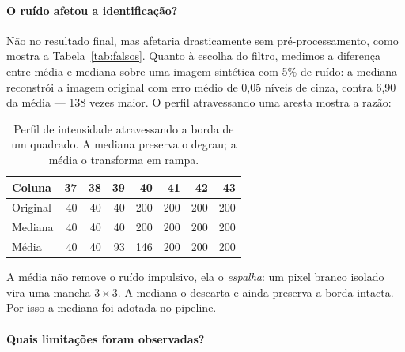 \documentclass[12pt,a4paper]{article}
\begin{document}
\paragraph{O ruído afetou a identificação?} Não no resultado final, mas
afetaria drasticamente sem pré-processamento, como mostra a
Tabela~\ref{tab:falsos}. Quanto à escolha do filtro, medimos a diferença entre
média e mediana sobre uma imagem sintética com 5\% de ruído: a mediana
reconstrói a imagem original com erro médio de 0,05 níveis de cinza, contra
6,90 da média --- 138 vezes maior. O perfil atravessando uma aresta mostra a
razão:

\begin{table}[H]
\centering
\begin{tabular}{lrrrrrrr}
\toprule
\textbf{Coluna} & 37 & 38 & 39 & 40 & 41 & 42 & 43 \\
\midrule
Original & 40 & 40 & 40 & 200 & 200 & 200 & 200 \\
Mediana  & 40 & 40 & 40 & 200 & 200 & 200 & 200 \\
Média    & 40 & 40 & 93 & 146 & 200 & 200 & 200 \\
\bottomrule
\end{tabular}
\caption{Perfil de intensidade atravessando a borda de um quadrado. A mediana
preserva o degrau; a média o transforma em rampa.}
\end{table}

A média não remove o ruído impulsivo, ela o \emph{espalha}: um pixel branco
isolado vira uma mancha $3\times3$. A mediana o descarta e ainda preserva a
borda intacta. Por isso a mediana foi adotada no pipeline.

\paragraph{Quais limitações foram observadas?}
\end{document}
